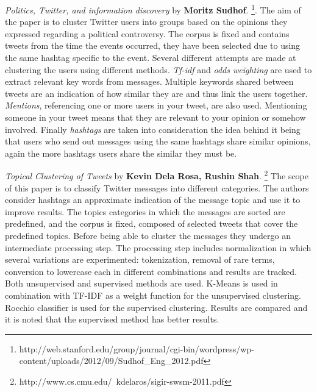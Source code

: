 \textit{Politics, Twitter, and information discovery} by \textbf{Moritz Sudhof}. \footnote{http://web.stanford.edu/group/journal/cgi-bin/wordpress/wp-content/uploads/2012/09/Sudhof_Eng_2012.pdf}.
\newline
The aim of the paper is to cluster Twitter users into groups based on the opinions they expressed regarding a political controversy. The corpus is fixed and contains tweets from the time the events occurred, they have been selected due to using the same hashtag specific to the event.
\newline
Several different attempts are made at clustering the users using different methods. \textit{Tf-idf} and \textit{odds weighting} are used to extract relevant key words from messages. Multiple keywords shared between tweets are an indication of how similar they are and thus link the users together. \textit{Mentions}, referencing one or more users in your tweet, are also used. Mentioning someone in your tweet means that they are relevant to your opinion or somehow involved.
\newline
Finally \textit{hashtags} are taken into consideration the idea behind it being that users who send out messages using the same hashtags share similar opinions, again the more hashtags users share the similar they must be.

\textit{Topical Clustering of Tweets} by \textbf{Kevin Dela Rosa, Rushin Shah}. \footnote{http://www.cs.cmu.edu/~kdelaros/sigir-swsm-2011.pdf}
\newline
The scope of this paper is to classify Twitter messages into different categories. The authors consider hashtags an approximate indication of the message topic and use it to improve results. The topics categories in which the messages are sorted are predefined, and the corpus is fixed, composed of selected tweets that cover the predefined topics.
\newline
Before being able to cluster the messages they undergo an intermediate processing step. The processing step includes normalization in which several variations are experimented: tokenization, removal of rare terms, conversion to lowercase each in different combinations and results are tracked.
\newline
Both unsupervised and supervised methods are used. K-Means is used in combination with TF-IDF as a weight function for the unsupervised clustering. Rocchio classifier is used for the supervised clustering. Results are compared and it is noted that the supervised method has better results.

